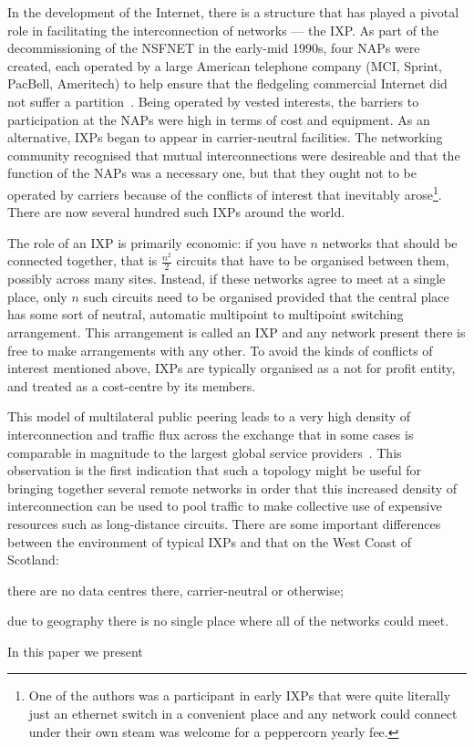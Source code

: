 In the development of the Internet, there is a structure that has
played a pivotal role in facilitating the interconnection of networks
--- the \acf{IXP}. As part of the decommissioning of the \ac{NSFNET}
in the early-mid 1990s, four \acp{NAP} were created, each operated by
a large American telephone company (MCI, Sprint, PacBell, Ameritech)
to help ensure that the fledgeling commercial Internet did not suffer
a
partition~\cite{hayes1997computing,Ager:2012:ALE:2342356.2342393}. Being
operated by vested interests, the barriers to participation at
the \acp{NAP} were high in terms of cost and equipment. As an
alternative, \acp{IXP} began to appear in carrier-neutral
facilities. The networking community recognised that mutual
interconnections were desireable and that the function of
the \acp{NAP} was a necessary one, but that they ought not to be
operated by carriers because of the conflicts of interest that
inevitably arose\footnote{One of the authors was a participant in
early \acp{IXP} that were quite literally just an ethernet switch in a
convenient place and any network could connect under their own steam
was welcome for a peppercorn yearly fee.}. There are now several
hundred such \acp{IXP} around the world.

The role of an \ac{IXP} is primarily economic: if
you have $n$ networks that should be connected together, that is
$\frac{n^2}{2}$ circuits that have to be organised between them,
possibly across many sites. Instead, if these networks agree to meet
at a single place, only $n$ such circuits need to be organised
provided that the central place has some sort of neutral, automatic
multipoint to multipoint switching arrangement. This arrangement is
called an \ac{IXP} and any network present there is free to make
arrangements with any other. To avoid the kinds of conflicts of
interest mentioned above, \acp{IXP} are typically organised as a not
for profit entity, and treated as a cost-centre by its members.

This model of multilateral public peering leads to a very high
density of interconnection and traffic flux across the exchange that
in some cases is comparable in magnitude to the largest global
service providers~\cite{Ager:2012:ALE:2342356.2342393}. This
observation is the first indication that such a topology might be
useful for bringing together several remote networks in order that
this increased density of interconnection can be used to pool traffic
to make collective use of expensive resources such as long-distance
circuits. There are some important differences between the environment
of typical \acp{IXP} and that on the West Coast of Scotland:
\begin{inparaenum}[(i)]
  \item there are no data centres there, carrier-neutral or otherwise;
  \item due to geography there is no single place where all of the
    networks could meet.
\end{inparaenum}

In this paper we present 
